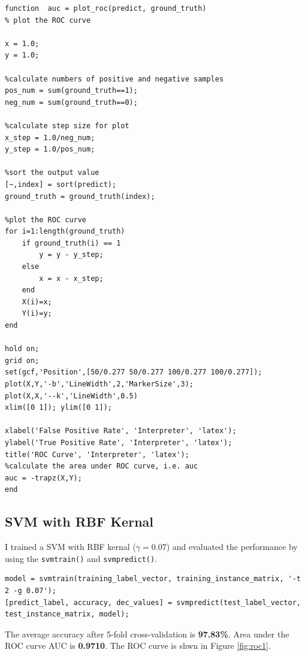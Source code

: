 \documentclass[a4paper,12pt]{article} %
\begin{document}
\begin{footnotesize}
\begin{verbatim}
function  auc = plot_roc(predict, ground_truth)
% plot the ROC curve

x = 1.0;
y = 1.0;

%calculate numbers of positive and negative samples
pos_num = sum(ground_truth==1);
neg_num = sum(ground_truth==0);

%calculate step size for plot
x_step = 1.0/neg_num;
y_step = 1.0/pos_num;

%sort the output value
[~,index] = sort(predict);
ground_truth = ground_truth(index);

%plot the ROC curve
for i=1:length(ground_truth)
    if ground_truth(i) == 1
        y = y - y_step;
    else
        x = x - x_step;
    end
    X(i)=x;
    Y(i)=y;
end

hold on;
grid on;
set(gcf,'Position',[50/0.277 50/0.277 100/0.277 100/0.277]);
plot(X,Y,'-b','LineWidth',2,'MarkerSize',3);
plot(X,X,'--k','LineWidth',0.5)
xlim([0 1]); ylim([0 1]);

xlabel('False Positive Rate', 'Interpreter', 'latex');
ylabel('True Positive Rate', 'Interpreter', 'latex');
title('ROC Curve', 'Interpreter', 'latex');
%calculate the area under ROC curve, i.e. auc
auc = -trapz(X,Y);
end
\end{verbatim}
\end{footnotesize}

\subsection{SVM with RBF Kernal}
\hspace{0.7cm}
I trained a SVM with RBF kernal ($\gamma =0.07$) and evaluated the performance by using the \texttt{svmtrain()} and \texttt{svmpredict()}.

\begin{footnotesize}
\begin{verbatim}
model = svmtrain(training_label_vector, training_instance_matrix, '-t 2 -g 0.07');
[predict_label, accuracy, dec_values] = svmpredict(test_label_vector, test_instance_matrix, model);
\end{verbatim}
\end{footnotesize}

\hspace{0.7cm}
The average accuracy after 5-fold cross-validation is \textbf{97.83\%}. Area under the ROC curve AUC is \textbf{0.9710}. The ROC curve is shwn in Figure \ref{fig:roc1}.
\end{document}
